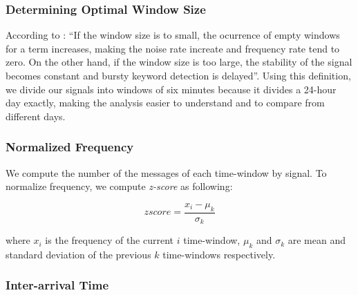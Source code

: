\documentclass[sigconf]{acmart}
\begin{document}
\subsubsection{Determining Optimal Window Size}

According to \cite{guzman2013line}: ``If the window size is to small, the ocurrence of empty windows for a term increases, making the noise rate increate and frequency rate tend to zero. On the other hand, if the window size is too large, the stability of the signal becomes constant and bursty keyword detection is delayed''. Using this definition, we divide our signals into windows of six minutes because it divides a 24-hour day exactly, making the analysis easier to understand and to compare from different days.


\subsubsection{Normalized Frequency}
We compute the number of the messages of each time-window by signal. To normalize frequency, we compute \textit{z-score} as following:

\begin{equation} \label{eq:1}
zscore = \frac{x_{i} - \mu_{k} }{\sigma_{k}}
\end{equation}

where $x_{i}$ is the frequency of the current $i$ time-window, $\mu_{k}$ and  $\sigma_{k}$ are mean and standard deviation of the previous $k$ time-windows respectively.

\subsubsection{Inter-arrival Time}
\end{document}
